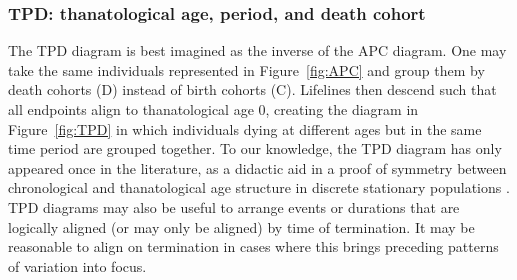 \documentclass[12pt,oneside,a4paper]{article} %
\theoremstyle{definition}
\newcommand\tgh[1]{\raisebox{-.25\height}{\texttt{[image: Figures/triadtable/triad\#1.pdf]}}}
\begin{document}
\FloatBarrier
\subsubsection{TPD: thanatological age, period, and death cohort}%
\label{sec:tpd}
The TPD diagram is best imagined as the inverse of the APC diagram. One may take
the same individuals represented in Figure~\ref{fig:APC} and group them by death cohorts (D) instead
of birth cohorts (C). Lifelines then descend such that all
endpoints align to thanatological age 0, creating the diagram in
Figure~\ref{fig:TPD} in which individuals dying at different ages but in the same time period are grouped together.
To our knowledge, the TPD diagram has only appeared once in the literature, as
a didactic aid in a proof of symmetry between chronological and thanatological
age structure in discrete stationary populations \citep{villavicencioRiffeSymmetires2016}. TPD
diagrams may also be useful to arrange events or durations that are logically
aligned (or may only be aligned) by time of termination. It may be reasonable to
align on termination in cases where this brings preceding patterns of
variation into focus.
\end{document}
